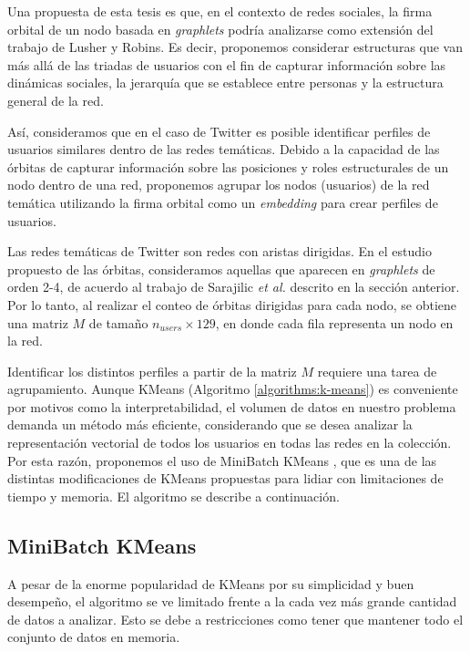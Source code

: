 Una propuesta de esta tesis es que, en el contexto de redes sociales, la firma orbital de un nodo basada en \textit{graphlets} podría analizarse como extensión del trabajo de Lusher y Robins. Es decir, proponemos considerar estructuras que van más allá de las triadas de usuarios con el fin de capturar información sobre las dinámicas sociales, la jerarquía que se establece entre personas y la estructura general de la red. 

Así, consideramos que en el caso de Twitter es posible identificar perfiles de usuarios similares dentro de las redes temáticas. Debido a la capacidad de las órbitas de capturar información sobre las posiciones y roles estructurales de un nodo dentro de una red, proponemos agrupar los nodos (usuarios) de la red temática utilizando la firma orbital como un \textit{embedding} para crear perfiles de usuarios.

Las redes temáticas de Twitter son redes con aristas dirigidas. En el estudio propuesto de las órbitas, consideramos aquellas que aparecen en \textit{graphlets} de orden 2-4, de acuerdo al trabajo de Sarajilic \textit{et al.} descrito en la sección anterior.  Por lo tanto, al realizar el conteo de órbitas dirigidas para cada nodo, se obtiene una matriz $M$ de tamaño $n_{users}\times 129$, en donde cada fila representa un nodo en la red. 


Identificar los distintos perfiles a partir de la matriz $M$ requiere una tarea de agrupamiento. 
Aunque KMeans (Algoritmo \ref{algorithms:k-means}) es conveniente por motivos como la interpretabilidad, el volumen de datos en nuestro problema demanda un método más eficiente, considerando que se desea analizar la representación vectorial de todos los usuarios en todas las redes en la colección. Por esta razón, proponemos el uso de MiniBatch KMeans \cite{sculley_web-scale_2010}, que es una de las distintas modificaciones de KMeans propuestas para lidiar con limitaciones de tiempo y memoria. El algoritmo se describe a continuación. 

\subsection{MiniBatch KMeans}
A pesar de la enorme popularidad de KMeans por su simplicidad y buen desempeño, el algoritmo se ve limitado frente a la cada vez más grande cantidad de datos a analizar. Esto se debe a restricciones como tener que mantener todo el conjunto de datos en memoria. 

